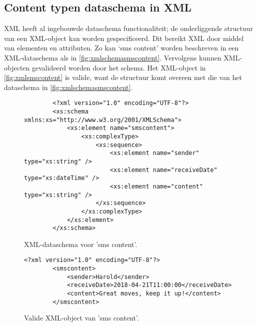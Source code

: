 \begin{appendices}
    \chapter{Content typen dataschema in XML}
    \label{app:contenttypeschemeinxml}
    XML heeft al ingebouwde dataschema functionaliteit; de onderliggende structuur van een XML-object kan worden gespecificeerd. Dit bereikt XML door middel van elementen en attributen. Zo kan ‘sms content’ worden beschreven in een XML-dataschema als in \autoref{fig:xmlschemasmscontent}. Vervolgens kunnen XML-objecten gevalideerd worden door het schema. Het XML-object in \autoref{fig:xmlsmscontent} is valide, want de structuur komt overeen met die van het dataschema in \autoref{fig:xmlschemasmscontent}.

    \begin{figure}[htb]
        \centering
        \begin{lstlisting}
        <?xml version="1.0" encoding="UTF-8"?>
        <xs:schema xmlns:xs="http://www.w3.org/2001/XMLSchema">
            <xs:element name="smscontent">
                <xs:complexType>
                    <xs:sequence>
                        <xs:element name="sender" type="xs:string" />
                        <xs:element name="receiveDate" type="xs:dateTime" />
                        <xs:element name="content" type="xs:string" />
                    </xs:sequence>
                </xs:complexType>
            </xs:element>
        </xs:schema>                
        \end{lstlisting}
        \caption{XML-dataschema voor 'sms content'.}
        \label{fig:xmlschemasmscontent}
    \end{figure}

    \begin{figure}[htb]
        \centering
        \lstset{language=XML}
        \begin{lstlisting}[firstnumber=1]
        <?xml version="1.0" encoding="UTF-8"?>
        <smscontent>
            <sender>Harold</sender>
            <receiveDate>2018-04-21T11:00:00</receiveDate>
            <content>Great moves, keep it up!</content>
        </smscontent>              
        \end{lstlisting}
        \caption{Valide XML-object van 'sms content'.}
        \label{fig:xmlsmscontent}
    \end{figure}
    

\end{appendices}
